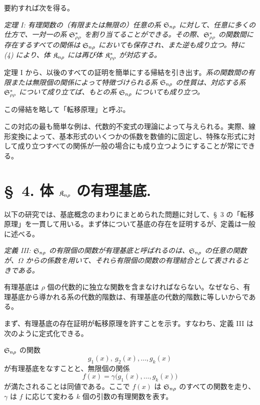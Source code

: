 \documentclass[11pt]{jlreq}
\begin{document}
要約すれば次を得る。

\emph{定理 I: 有理関数の（有限または無限の）任意の系 $\mathfrak{S}_{n\rho}$ に対して、任意に多くの仕方で、一対一の系 $\mathfrak{S}^*_{\rho\rho}$ を割り当てることができる。その際、$\mathfrak{S}^*_{\rho\rho}$ の関数間に存在するすべての関係は $\mathfrak{S}_{n\rho}$ においても保存され、また逆も成り立つ。特に (4) により、体 $\mathfrak{K}_{n\rho}$ には再び体 $\mathfrak{K}^*_{\rho\rho}$ が対応する。}

定理 I から、以後のすべての証明を簡単にする帰結を引き出す。\emph{系の関数間の有限または無限個の関係によって特徴づけられる系 $\mathfrak{S}_{n\rho}$ の性質は、対応する系 $\mathfrak{S}^*_{\rho\rho}$ について成り立てば、もとの系 $\mathfrak{S}_{n\rho}$ についても成り立つ。}

この帰結を略して「転移原理」と呼ぶ。

\providecommand{\Lsys}{\mathfrak{L}}
\providecommand{\Jdom}{\mathfrak{J}}

\clearpage
この対応の最も簡単な例は、代数的不変式の理論によって与えられる。実際、線形変換によって、基本形式のいくつかの係数を数値的に固定し、特殊な形式に対して成り立つすべての関係が一般の場合にも成り立つようにすることが常にできる。

\section*{\S\ 4. 体 $\mathfrak{K}_{n\rho}$ の有理基底.}

以下の研究では、基底概念のまわりにまとめられた問題に対して、\S\ 3 の「転移原理」を一貫して用いる。まず体について基底の存在を証明するが、定義は一般に述べる。

\emph{定義 III: $\mathfrak{S}_{n\rho}$ の有限個の関数が有理基底と呼ばれるのは、$\mathfrak{S}_{n\rho}$ の任意の関数が、$\Omega$ からの係数を用いて、それら有限個の関数の有理結合として表されるときである。}

有理基底は $\rho$ 個の代数的に独立な関数を含まなければならない。なぜなら、有理基底から導かれる系の代数的階数は、有理基底の代数的階数に等しいからである。

まず、有理基底の存在証明が転移原理を許すことを示す。すなわち、定義 III は次のように定式化できる。

$\mathfrak{S}_{n\rho}$ の関数
\[
  g_1(x),\ g_2(x),\ldots, g_k(x)
\]
が有理基底をなすことと、無限個の関係
\begin{equation}
  f(x)=\gamma\bigl(g_1(x),\ldots,g_k(x)\bigr)
\tag{1}
\end{equation}
が満たされることは同値である。ここで $f(x)$ は $\mathfrak{S}_{n\rho}$ のすべての関数を走り、$\gamma$ は $f$ に応じて変わる $k$ 個の引数の有理関数を表す。
\end{document}
